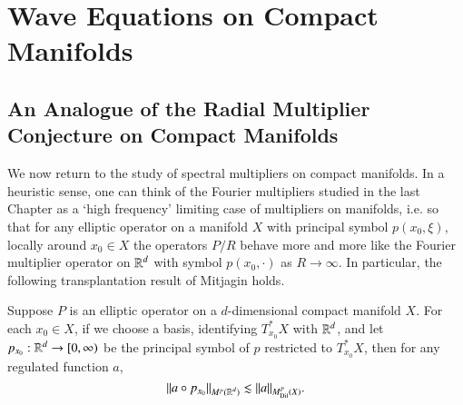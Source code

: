 \chapter{Wave Equations on Compact Manifolds} \label{chap:waveequation}

\section{An Analogue of the Radial Multiplier Conjecture on Compact Manifolds} \label{sec:AnAnalogueOf}

We now return to the study of spectral multipliers on compact manifolds. In a heuristic sense, one can think of the Fourier multipliers studied in the last Chapter as a `high frequency' limiting case of multipliers on manifolds, i.e. so that for any elliptic operator on a manifold $X$ with principal symbol $p(x_0,\xi)$, locally around $x_0 \in X$ the operators $P/R$ behave more and more like the Fourier multiplier operator on $\operatorname{\mathbb{R}}^d$ with symbol $p(x_0,\cdot)$ as $R \to \infty$. In particular, the following transplantation result of Mitjagin \cite{Mitjagin} holds.

\begin{theorem} \label{Pawdiojwaoij123423423423423}
  Suppose $P$ is an elliptic operator on a $d$-dimensional compact manifold $X$. For each $x_0 \in X$, if we choose a basis, identifying $T_{x_0}^* X$ with $\operatorname{\mathbb{R}}^d$, and let $p_{x_0}: \operatorname{\mathbb{R}}^d \to [0,\infty)$ be the principal symbol of $p$ restricted to $T_{x_0}^* X$, then for any regulated function $a$,
  \[ \| a \circ p_{x_0} \|_{M^p(\operatorname{\mathbb{R}}^d)} \lesssim \| a \|_{M^p_{\text{Dil}}(X)}. \]
\end{theorem}

